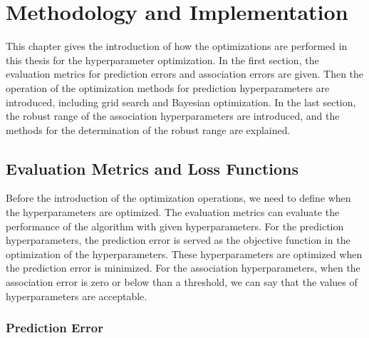 \chapter{Methodology and Implementation}


This chapter gives the introduction of how the optimizations are performed in this thesis for the hyperparameter optimization. In the first section, the evaluation metrics for prediction errors and association errors are given. Then the operation of the optimization methods for prediction hyperparameters are introduced, including grid search and Bayesian optimization. In the last section, the robust range of the association hyperparameters are introduced, and the methods for the determination of the robust range are explained.

\section{Evaluation Metrics and Loss Functions}
\label{loss function}

Before the introduction of the optimization operations, we need to define when the hyperparameters are optimized. The evaluation metrics can evaluate the performance of the algorithm with given hyperparameters. For the prediction hyperparameters, the prediction error is served as the objective function in the optimization of the hyperparameters. These hyperparameters are optimized when the prediction error is minimized. For the association hyperparameters, when the association error is zero or below than a threshold, we can say that the values of hyperparameters are acceptable.

\subsection{Prediction Error}
\label{Prediction Error}


